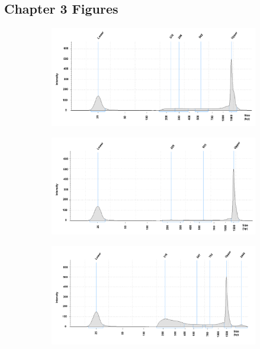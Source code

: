\subsection{Chapter 3 Figures}
\begin{figure}[htbp]
\centering
\begin{subfigure}{0.70\textwidth}
\centering
\includegraphics[width=\textwidth]{./Appendix/pdfs/Chapter3/FAST_ATAC_skin_tapestation_C1}
\caption{\textbf{}}
\end{subfigure}
\begin{subfigure}{0.70\textwidth}
\centering
\includegraphics[width=\textwidth]{./Appendix/pdfs/Chapter3/FAST_ATAC_skin_tapestation_C3}
\caption{\textbf{}}
\end{subfigure}
\begin{subfigure}{0.70\textwidth}
\centering
\includegraphics[width=\textwidth]{./Appendix/pdfs/Chapter3/FAST_ATAC_skin_tapestation_C4}

\end{subfigure}
\end{figure}
